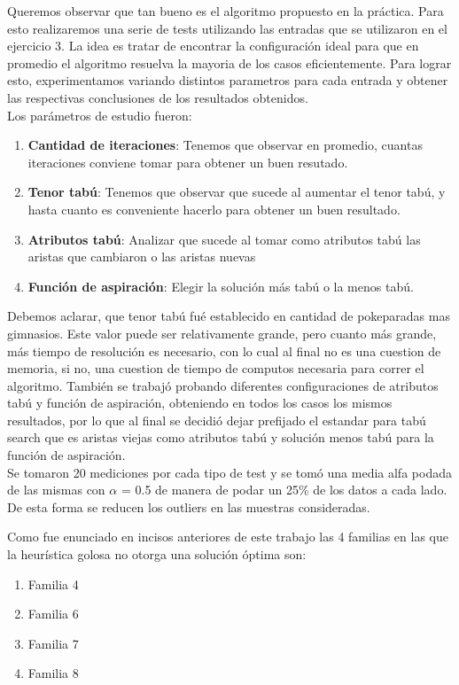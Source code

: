 Queremos observar que tan bueno es el algoritmo propuesto en la práctica. Para esto realizaremos una serie de tests utilizando las entradas que se utilizaron en el ejercicio 3.
La idea es tratar de encontrar la configuración ideal para que en promedio el algoritmo resuelva la mayoria de los casos eficientemente. Para lograr esto, experimentamos variando distintos parametros para cada entrada y obtener las respectivas conclusiones de los resultados obtenidos.\\
Los parámetros de estudio fueron:

\begin{enumerate}
\item  \textbf{Cantidad de iteraciones}: Tenemos que observar en promedio, cuantas iteraciones conviene tomar para obtener un buen resutado.
\item \textbf{Tenor tabú}: Tenemos que observar que sucede al aumentar el tenor tabú, y hasta cuanto es conveniente hacerlo para obtener un buen resultado.
\item \textbf{Atributos tabú}: Analizar que sucede al tomar como atributos tabú las aristas que cambiaron o las aristas nuevas
\item \textbf{Función de aspiración}: Elegir la solución más tabú o la menos tabú.
\end{enumerate}

Debemos aclarar, que tenor tabú fué establecido en cantidad de pokeparadas mas gimnasios. Este valor puede ser relativamente grande, pero cuanto más grande, más tiempo de resolución es necesario, con lo cual al final no es una cuestion de memoria, si no, una cuestion de tiempo de computos necesaria para correr el algoritmo.
También se trabajó probando diferentes configuraciones de atributos tabú y función de aspiración, obteniendo en todos los casos los mismos resultados, por lo que al final se decidió dejar prefijado el estandar para tabú search que es aristas viejas como atributos tabú y solución menos tabú para la función de aspiración.\\

Se tomaron 20 mediciones por cada tipo de test y se tomó una media alfa podada de las mismas con $\alpha$ = 0.5 de manera de podar un 25\% de los datos a cada lado. De esta forma se reducen los outliers en las muestras consideradas.

Como fue enunciado en incisos anteriores de este trabajo las 4 familias en las que la heur\'istica golosa no otorga una soluci\'on \'optima son:

\begin{enumerate}
\item Familia 4
\item Familia 6
\item Familia 7
\item Familia 8
\end{enumerate}


